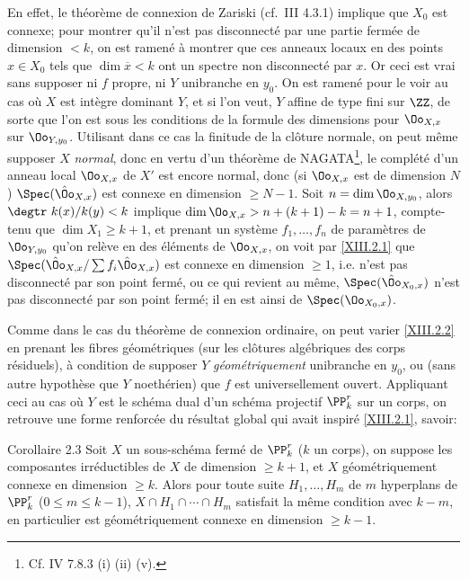 En effet, le th\'eor\`eme de connexion de Zariski (cf.\ \EGA III 4.3.1) implique que $X_0$ est connexe; pour montrer qu'il n'est pas disconnect\'e par une partie ferm\'ee de dimension $<k$, on est ramen\'e \`a montrer que ces anneaux locaux en des points $x\in X_0$ tels que $\dim \overline{x}<k$ ont un spectre non disconnect\'e par $x$. Or ceci est vrai sans supposer ni $f$ propre, ni $Y$ unibranche en $y_0$. On est ramen\'e pour le voir au cas o\`u $X$ est int\`egre dominant $Y$, et si l'on veut, $Y$ affine de type fini sur $\ZZ$, de sorte que l'on est sous les conditions de la formule des dimensions pour $\Oo_{X, x}$ sur $\Oo_{Y, y_0}$. Utilisant dans ce cas la finitude de la cl\^{o}ture normale, on peut m\^eme supposer $X$ \emph{normal}, donc en vertu d'un th\'eor\`eme de NAGATA\footnote{Cf. \EGA IV 7.8.3 (i) (ii) (v).}, le compl\'et\'e d'un anneau local $\Oo_{X, x}$ de $X'$ est encore normal, donc (si $\Oo_{X, x}$ est de dimension $N$) $\Spec (\hat{\Oo}_{X, x})$ est connexe en dimension $\ge N-1$. Soit $n=\dim\Oo_{X, y_0}$, alors $\degtr~k(x)/k(y)<k$ implique $\dim \Oo_{X, x}>n+(k+1)-k=n+1$, compte-tenu que  $\dim X_1\ge k+1$, et prenant un syst\`eme $f_1, \dotsc, f_n$ de param\`etres de $\Oo_{Y, y_0}$ qu'on rel\`eve en des \'el\'ements de $\Oo_{X, x}$, on voit par \ref{XIII.2.1} que $\Spec (\hat{\Oo}_{X, x}/\sum f_i\hat{\Oo}_{X, x})$ est connexe en dimension $\ge 1$, i.e. n'est pas disconnect\'e par son point ferm\'e, ou ce qui revient au m\^eme, $\Spec(\hat{\Oo}_{X_0, x})$ n'est pas disconnect\'e par son point ferm\'e; \afortiori il en est ainsi de $\Spec (\Oo_{X_0, x})$.

Comme dans le cas du th\'eor\`eme de connexion ordinaire, on peut varier \ref{XIII.2.2} en prenant les fibres g\'eom\'etriques (sur les cl\^{o}tures alg\'ebriques des corps r\'esiduels), \`a condition de supposer $Y$ \emph{géométriquement} unibranche en $y_0$, ou (sans autre hypoth\`ese que $Y$ noeth\'erien) que $f$ est universellement ouvert. Appliquant ceci au cas o\`u $Y$ est le sch\'ema dual d'un sch\'ema projectif $\PP_k^r$ sur un corps, on retrouve une forme renforc\'ee du r\'esultat global qui avait inspir\'e \ref{XIII.2.1}, savoir:

\label{XIII.2.3}
\begin{enonce*}{Corollaire 2.3\ndemark}
Soit $X$ un sous-sch\'ema ferm\'e de $\PP^r_k$ ($k$ un corps), on suppose les composantes irr\'eductibles de $X$ de dimension $\ge k+1$, et $X$ g\'eom\'etriquement connexe en dimension $\ge k$. Alors pour toute suite $H_1, \dotsc, H_m$ de $m$ hyperplans de $\PP^r_k$ ($0\le m\le k-1$), $X\cap H_1\cap \dotsb \cap H_m$ satisfait la m\^eme condition avec $k-m$, en particulier est g\'eom\'etriquement connexe en dimension $\ge k-1$.
\end{enonce*}

